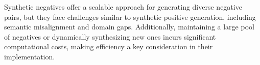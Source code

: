 Synthetic negatives offer a scalable approach for generating diverse negative pairs, but they face challenges similar to synthetic positive generation, including semantic misalignment and domain gaps. Additionally, maintaining a large pool of negatives or dynamically synthesizing new ones incurs significant computational costs, making efficiency a key consideration in their implementation. 

